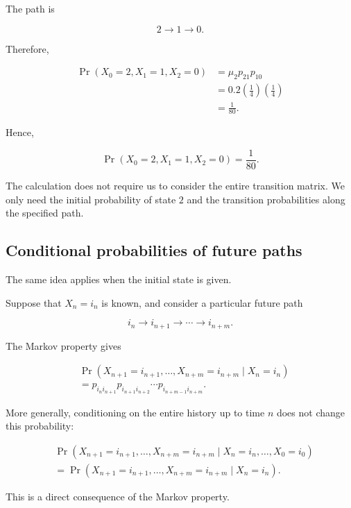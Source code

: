 \documentclass[
  letterpaper,
  DIV=11,
  numbers=noendperiod]{scrartcl}
\theoremstyle{definition}
\theoremstyle{remark}
\begin{document}
The path is

\[
2\longrightarrow1\longrightarrow0.
\]

Therefore,

\[
\begin{aligned}
\Pr(X_0=2,X_1=1,X_2=0)
&=
\mu_2p_{21}p_{10}\\
&=
0.2\left(\frac14\right)\left(\frac14\right)\\
&=
\frac{1}{80}.
\end{aligned}
\]

Hence,

\[
\boxed{
\Pr(X_0=2,X_1=1,X_2=0)=\frac{1}{80}.
}
\]

The calculation does not require us to consider the entire transition
matrix. We only need the initial probability of state \(2\) and the
transition probabilities along the specified path.

\subsection{Conditional probabilities of future
paths}\label{conditional-probabilities-of-future-paths}

The same idea applies when the initial state is given.

Suppose that \(X_n=i_n\) is known, and consider a particular future path

\[
i_n\longrightarrow i_{n+1}\longrightarrow\cdots\longrightarrow i_{n+m}.
\]

The Markov property gives

\[
\begin{aligned}
&\Pr(
X_{n+1}=i_{n+1},
\ldots,
X_{n+m}=i_{n+m}
\mid X_n=i_n)\\
&=
p_{i_ni_{n+1}}
p_{i_{n+1}i_{n+2}}
\cdots
p_{i_{n+m-1}i_{n+m}}.
\end{aligned}
\]

More generally, conditioning on the entire history up to time \(n\) does
not change this probability:

\[
\begin{aligned}
&\Pr(
X_{n+1}=i_{n+1},
\ldots,
X_{n+m}=i_{n+m}
\mid X_n=i_n,\ldots,X_0=i_0)\\
&=
\Pr(
X_{n+1}=i_{n+1},
\ldots,
X_{n+m}=i_{n+m}
\mid X_n=i_n).
\end{aligned}
\]

This is a direct consequence of the Markov property.
\end{document}
